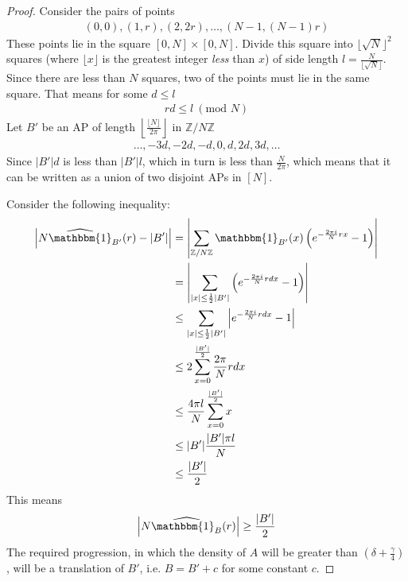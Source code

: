 \documentclass[12pt, titlepage]{article}
\theoremstyle{definition}
\newcommand{\znz}{\mathbb{Z}/N\mathbb{Z}}
\newcommand{\indi}{\mathbbm{1}}
\begin{document}
\begin{proof}
    Consider the pairs of points
    \begin{align*}
        (0, 0), (1, r), (2, 2r), \ldots, (N-1, (N-1)r)
    \end{align*}
    These points lie in the square $[0, N] \times [0, N]$. Divide this square into $\lfloor \sqrt{N} \rfloor^2$ squares (where $\lfloor x \rfloor$ is the greatest integer \emph{less} than $x$) of side length $l = \frac{N}{\lfloor \sqrt{N} \rfloor}$. Since there are less than $N$ squares, two of the points must lie in the same square. That means for some $d \leq l$
    \begin{align*}
        rd \leq l\ (\text{mod } N)
    \end{align*}
    Let $B'$ be an AP of length $ \left\lfloor \frac{\lfloor N \rfloor}{2\pi} \right\rfloor$ in $\znz$
    \begin{align*}
        \ldots , -3d, -2d, -d, 0, d, 2d, 3d, \ldots
    \end{align*}
    Since $|B'|d$ is less than $|B'|l$, which in turn is less than $\frac{N}{2\pi}$, which means that it can be written as a union of two disjoint APs in $[N]$.

    Consider the following inequality:
    \begin{align*}
        \left|N \widehat{\indi}_{B'}(r)  - |B'|\right| &= \left| \sum_{\znz} \indi_{B'}(x)\left(e^{-\frac{2\pi i}{N}rx} - 1 \right) \right| \\
        &= \left| \sum_{|x| \leq \frac{1}{2} |B'|} \left(e^{-\frac{2\pi i}{N}rdx} - 1 \right) \right| \\
        &\leq \sum_{|x| \leq \frac{1}{2} |B'|} \left| e^{-\frac{2\pi i}{N}rdx} - 1 \right| \\
        &\leq 2 \sum_{x=0}^{\frac{|B'|}{2}} \frac{2\pi}{N} rdx \\
        &\leq \frac{4\pi l}{N} \sum_{x=0}^{\frac{|B'|}{2}} x \\
        &\leq |B'| \frac{|B'| \pi l}{N} \\
        &\leq \frac{|B'|}{2}
    \end{align*}
    This means
    \begin{align*}
        \left|N \widehat{\indi_B}(r) \right| \geq \frac{|B'|}{2}
    \end{align*}
    The required progression, in which the density of $A$ will be greater than $\left( \delta + \frac{\gamma}{4} \right)$, will be a translation of $B'$, i.e. $B = B' + c$ for some constant $c$.
    

\end{proof}
\end{document}
